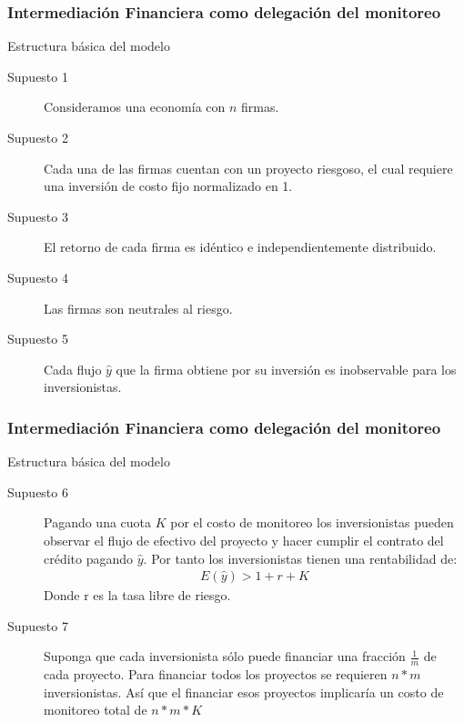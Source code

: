 \documentclass[10pt, xcolor=table, x11names]{beamer}
\begin{document}
\begin{frame}
    \frametitle{{\normalsize Intermediación Financiera como delegación del monitoreo} {}}
    
    \begin{block} {Estructura básica del modelo}
        \begin{description}
            \item[Supuesto 1] Consideramos una economía con $n$ firmas.
            \item[Supuesto 2] Cada una de las firmas cuentan con un proyecto riesgoso, el cual requiere una inversión de costo fijo normalizado en 1. 
            \item[Supuesto 3] El retorno de cada firma es idéntico e independientemente distribuido.  
            \item[Supuesto 4]  Las firmas son neutrales al riesgo.
            \item[Supuesto 5] Cada flujo $\hat{y}$ que la firma obtiene por su inversión es inobservable para los inversionistas.
            \end{description}
        
    \end{block}	
    
\end{frame}





\begin{frame}
    \frametitle{{\normalsize Intermediación Financiera como delegación del monitoreo} {}}
    
     \begin{block} {Estructura básica del modelo}
        \begin{description}
            \item[Supuesto 6] Pagando una cuota $K$ por el costo de monitoreo los inversionistas pueden observar el flujo de efectivo del proyecto y hacer cumplir el contrato del crédito pagando $\hat{y} $. Por tanto los inversionistas tienen una rentabilidad de:
            \begin{align}
            E(\hat{y})>1+r+K
            \end{align}
            Donde r es la tasa libre de riesgo.
            \item[Supuesto 7] Suponga que cada inversionista sólo puede financiar una fracción $\frac{1}{m}$ de cada proyecto. Para financiar todos los proyectos se requieren $n*m$ inversionistas. Así que el financiar esos proyectos implicaría un costo de monitoreo total de $ n*m*K$
           \end{description}
       
      
       
     \end{block}	
 

 

\end{frame}
\end{document}
